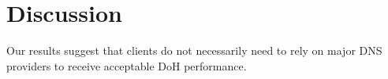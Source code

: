 \section{Discussion}\label{sec:discussion}
Our results suggest that clients do not necessarily need to rely on major DNS providers to receive acceptable DoH performance.
